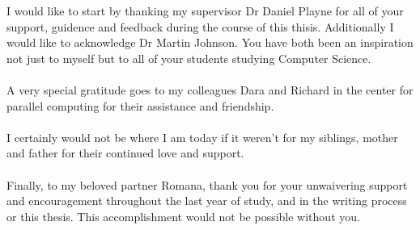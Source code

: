 
I would like to start by thanking my supervisor Dr Daniel Playne for all of your support, guidence and feedback during the course of this thisis. Additionally I would like to acknowledge Dr Martin Johnson. You have both been an inspiration not just to myself but to all of your students studying Computer Science. \\
\\
\noindent
A very special gratitude goes to my colleagues Dara and Richard in the center for parallel computing for their assistance and friendship. \\
\\
\noindent
I certainly would not be where I am today if it weren't for my siblings, mother and father for their continued love and support.\\
\\
\noindent
Finally, to my beloved partner Romana, thank you for your unwaivering support and encouragement throughout the last year of study, and in the writing process or this thesis. This accomplishment would not be possible without you. 
